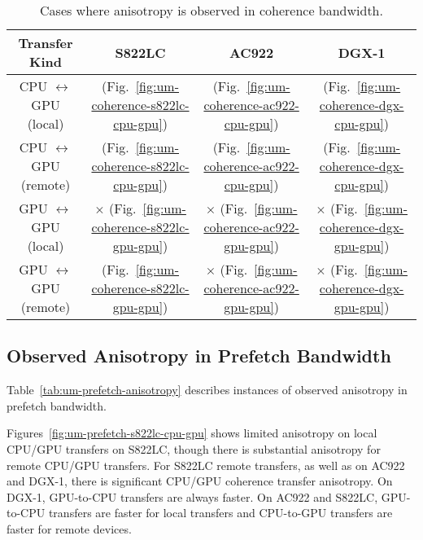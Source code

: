 \begin{table}[ht]
	\centering
	\caption[Anisotropy in Coherence Bandwidth]{
		Cases where anisotropy is observed in coherence bandwidth.
	}
	\label{tab:um-coherence-anisotropy}
	\begin{tabular}{cccc}
		\hline
		\textbf{Transfer Kind}             & \textbf{S822LC}                                         & \textbf{AC922}                                         & \textbf{DGX-1}                                      \\ \hline 
		CPU $\leftrightarrow$ GPU (local)  & \checkmark (Fig.~\ref{fig:um-coherence-s822lc-cpu-gpu}) & \checkmark (Fig.~\ref{fig:um-coherence-ac922-cpu-gpu}) & \checkmark (Fig.~\ref{fig:um-coherence-dgx-cpu-gpu}) \\ \hline
		CPU $\leftrightarrow$ GPU (remote) & \checkmark (Fig.~\ref{fig:um-coherence-s822lc-cpu-gpu}) & \checkmark (Fig.~\ref{fig:um-coherence-ac922-cpu-gpu}) & \checkmark (Fig.~\ref{fig:um-coherence-dgx-cpu-gpu}) \\ \hline
		GPU $\leftrightarrow$ GPU (local)  & $\times$   (Fig.~\ref{fig:um-coherence-s822lc-gpu-gpu}) & $\times$   (Fig.~\ref{fig:um-coherence-ac922-gpu-gpu}) & $\times$   (Fig.~\ref{fig:um-coherence-dgx-gpu-gpu}) \\ \hline
		GPU $\leftrightarrow$ GPU (remote) & \checkmark (Fig.~\ref{fig:um-coherence-s822lc-gpu-gpu}) & $\times$   (Fig.~\ref{fig:um-coherence-ac922-gpu-gpu}) & $\times$   (Fig.~\ref{fig:um-coherence-dgx-gpu-gpu}) \\ \hline
	\end{tabular}
\end{table}

\subsection{Observed Anisotropy in Prefetch Bandwidth}

Table~\ref{tab:um-prefetch-anisotropy} describes instances of observed anisotropy in prefetch bandwidth.

Figures~\ref{fig:um-prefetch-s822lc-cpu-gpu} shows limited anisotropy on local CPU/GPU transfers on S822LC, though there is substantial anisotropy for remote CPU/GPU transfers.
For S822LC remote transfers, as well as on AC922 and DGX-1, there is significant CPU/GPU coherence transfer anisotropy.
On DGX-1, GPU-to-CPU transfers are always faster.
On AC922 and S822LC, GPU-to-CPU transfers are faster for local transfers and CPU-to-GPU transfers are faster for remote devices.

